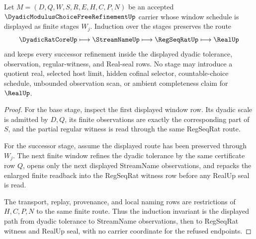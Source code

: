\begin{theorem}
\label{thm:dyadic-modulus-choice-free-refinement-stage-induction}
Let $M=(D,Q,W,S,R,E,H,C,P,N)$ be an accepted $\DyadicModulusChoiceFreeRefinementUp$ carrier whose window schedule is displayed as finite stages $W_j$. Induction over the stages preserves the route
$$
\DyadicRatCoreUp\longmapsto \StreamNameUp\longmapsto \RegSeqRatUp\longmapsto \RealUp
$$
and keeps every successor refinement inside the displayed dyadic tolerance, observation, regular-witness, and Real-seal rows. No stage may introduce a quotient real, selected host limit, hidden cofinal selector, countable-choice schedule, unbounded observation scan, or ambient completeness claim for $\RealUp$.
\end{theorem}
\begin{proof}
For the base stage, inspect the first displayed window row. Its dyadic scale is admitted by $D,Q$, its finite observations are exactly the corresponding part of $S$, and the partial regular witness is read through the same RegSeqRat route.

For the successor stage, assume the displayed route has been preserved through $W_j$. The next finite window refines the dyadic tolerance by the same certificate row $Q$, opens only the next displayed StreamName observations, and repacks the enlarged finite readback into the RegSeqRat witness row before any RealUp seal is read.

The transport, replay, provenance, and local naming rows are restrictions of $H,C,P,N$ to the same finite route. Thus the induction invariant is the displayed path from dyadic tolerance to StreamName observations, then to RegSeqRat witness and RealUp seal, with no carrier coordinate for the refused endpoints.
\end{proof}



